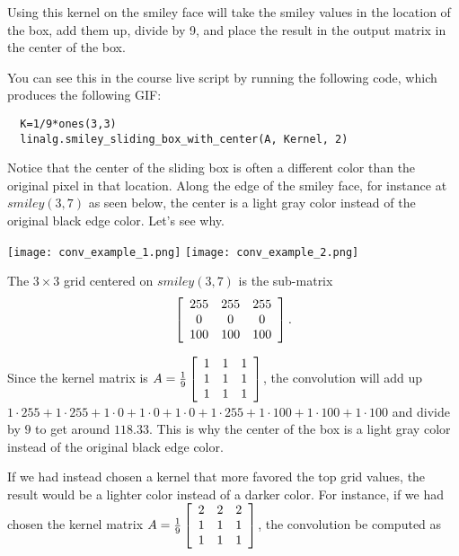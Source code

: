 \documentclass{ximera}
\begin{document}
\begin{problem}
\begin{enumerate}
Using this kernel on the smiley face will take the smiley values in the location of the box, add them up, divide by 9, and place the result in the output matrix in the center of the box.

You can see this in the course live script by running the following code, which produces the following GIF:
\begin{verbatim}
  K=1/9*ones(3,3)
  linalg.smiley_sliding_box_with_center(A, Kernel, 2)
\end{verbatim}

\begin{center}
\end{center}

Notice that the center of the sliding box is often a different color than the original pixel in that location. Along the edge of the smiley face, for instance at $smiley(3,7)$ as seen below, the center is a light gray color instead of the original black edge color. Let's see why.

\begin{center}
\texttt{[image: conv\_example\_1.png]}
\texttt{[image: conv\_example\_2.png]}
\end{center}

The $3\times 3$ grid centered on $smiley(3,7)$ is the sub-matrix
$$\startmat{ccc}
255 & 255 & 255\\
0 & 0 & 0\\
100 & 100 & 100
\stopmat.$$ 

Since the kernel matrix is $A=\frac{1}{9}\startmat{ccc}
1 & 1 & 1\\
1 & 1 & 1\\
1 & 1 & 1
\stopmat$, the convolution will add up $1\cdot 255+1\cdot 255+1\cdot 0+1\cdot 0+1\cdot 0+1\cdot 255+1\cdot 100+1\cdot 100+1\cdot 100$ and divide by $9$ to get around $118.33$. This is why the center of the box is a light gray color instead of the original black edge color.

If we had instead chosen a kernel that more favored the top grid values, the result would be a lighter color instead of a darker color. For instance, if we had chosen the kernel matrix $A=\frac{1}{9}\startmat{ccc}
  2 & 2 & 2\\
  1 & 1 & 1\\
  1 & 1 & 1
  \stopmat$, the convolution be computed as


\end{enumerate}
\end{problem}
\end{document}
